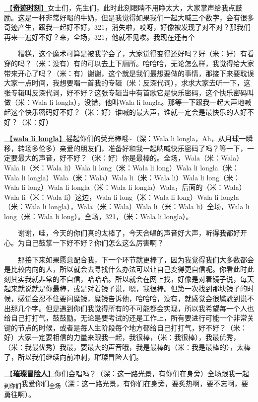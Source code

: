 \documentclass[]{ctexbook}
\begin{document}
\hyperref[magic-moment]{🎵【\textbf{奇迹时刻}】}女士们，先生们，此时此刻眼睛不用睁太大，大家掌声给我点鼓励。这是一杯非常好喝的牛奶，但是我觉得如果我们一起大喊三个数字，会有很多奇迹产生，跟我一起好不好，321，消失啦，哎呀，好像被发现了对不对？那我们再来一遍好不好？来，全场，321，他就不见喽。我现在还有个

  糟糕，这个魔术可算是被我学会了，大家觉得变得还好吗？好（米：好）有看穿的吗？（米：没有）有的可以去上下厕所。哈哈哈，无论怎么样，我觉得给大家带来开心了吗？（米：有）谢谢，这个就是我们最想要做的事情，那接下来要耽误大家一点时间，我想要唱一首我的专辑（米：反深代词），求求大家去听一下，这张专辑叫反深代词，好不好？这张专辑当中有首歌它是快乐密码，这个快乐密码叫做（米：Wala li longla），没错，他叫Wala li longla。那等一下跟我一起大声地喊起这个快乐密码好不好？（米：好）谁喊的最大声，谁就一定会是最快乐的人好不好？（米：好）

\hyperref[wala-li-longla]{🎵【\textbf{wala li longla}】}摇起你们的荧光棒哦\textasciitilde（深：Wala li longla，Ah，从月球一瞬移，转场多伦多）亲爱的朋友们，准备好和我一起呐喊快乐密码了吗？等一下，一定要最大的声音，好不好？（米：好）你是最棒的。全场，Wala（米：Wala）Wala li（米：Wala li）Wala li long（米：Wala li long）Wala li longla（米：Wala li longla）Wala（米：Wala）Wala li（米：Wala li）Wala li long（米：Wala li long）Wala li longla（米：Wala li longla）Wala，后面的（米：Wala）Wala li（米：Wala li）这边，Wala li long（米：Wala li long）Wala li longla（米：Wala li longla），Wala（米：Wala）Wala li（米：Wala li）全场，Wala li long（米：Wala li long）。全场，321，（米：Wala li longla）。

  谢谢，哇，今天的你们真的太棒了，今天合唱的声音好大声，听得我都好开心。为自己鼓掌一下好不好？你们怎么这么厉害啊？

  那接下来如果愿意配合我，下一个环节就更棒了，因为我觉得我们大多数都会是比较内向的人，所以就会去寻找什么办法可以让自己变得更自信呢。你看此时此刻其实我就非常的不自信，哈哈哈。所以就会在网上找，好像是对着镜子说，每天起来就说就是你最棒，或是对着镜子说，嗯，我很棒。但第一次找到那块镜子的时候，感觉会忍不住要问魔镜，魔镜告诉他，哈哈哈，没有，就感觉会很尴尬到说不出那几个字。但是遇到你们我觉得所有的不可能都会实现，所以我希望每一个人也给自己打打气，鼓鼓励。无论是要考试的还是工作上，所有要进行可能一个非常关键的节点的时候，或者是每人生阶段每个地方都给自己打打气，好不好？（米：好）大家一定要相信的力量来跟我一起，我很棒，（米：我很棒），我最优秀，（米：我最优秀）我最，要最大的声音哦，我是最棒的（米：我是最棒的），太棒了，所以我们继续向前冲刺，璀璨冒险人们。

\hyperref[adventurers]{🎵【\textbf{璀璨冒险人}】}你们会唱吗？（深：这一路光景，有你们在身旁）全场跟我一起\textsubscript{到你们}我爱你们\textsubscript{全场}（深：这一路光景，有你们在身旁，要炙热啊，要不忘啊，要勇往啊）。
\end{document}
